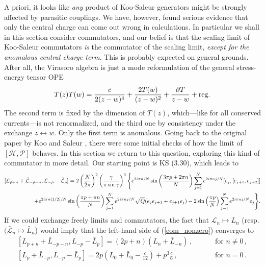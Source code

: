 \documentclass[a4paper,10pt]{article}
\newcommand{\linnea}[1]{$\framebox{\tiny L}$\ \textbf{\texttt{{\color{red}\footnotesize#1}}}}
\newcommand{\HN}{\mathcal{H}}
\newcommand{\PN}{\mathcal{P}}
\newcommand{\KSgen}{\mathcal{L}}
\begin{document}
A priori, it looks like {\sl any} product of Koo-Saleur generators might be strongly affected by parasitic couplings. We have, however, found serious evidence that only the central charge can come out wrong in calculations. In particular we shall in this section consider commutators, and our belief is that
  the scaling limit of Koo-Saleur commutators {\sl is} the commutator of the scaling limit, {\sl except for the anomalous central charge term}. This is probably expected on general grounds. After all, the Virasoro algebra is just a mode reformulation of the general stress-energy tensor OPE
%
\begin{equation}
T(z)T(w)={c\over 2(z-w)^4}+{2T(w)\over (z-w)^2}+{\partial T\over z-w}+\hbox{reg.}
\end{equation}
%
The second term is fixed by the dimension of $T(z)$, which---like for all conserved currents---is not renormalized,
and the third one by consistency under the exchange $z\leftrightarrow w$. Only the first term is anomalous. %
%
%
Going back to the original paper by Koo and Saleur \cite{KooSaleur}, there  were some initial checks of how the limit of $[\HN,\PN]$ behaves. In this section we return to this question, exploring this kind of commutator in more detail. Our starting point is KS (3.30), which leads to 
%
\begin{equation}\label{com_nonzero}
\begin{split}
[\KSgen_{p+n}+\bar{\KSgen}_{-p-n},\KSgen_{-p}-\bar{\KSgen}_{p}] 
= 2 \left({N\over2\pi}\right)^2 \left( \frac{\gamma}{\pi \sin \gamma} \right)^3\Bigg\{ e^{2 i \pi n/N}  \sin \left( \frac{3\pi p + 2\pi n}{N} \right) \sum_{j=1}^{N} e^{2i\pi n j/N}
 [e_j,[e_{j+1},e_{j+2}]] \\
 \quad+ e^{2 i \pi n(1/2)/N}  \sin \left( \frac{\pi p + \pi n}{N} \right) \sum_{j=1}^{N} e^{2i\pi n j/N}
 \sqrt{Q}(e_je_{j+1} + e_{j+1}e_j)  
 -2  \sin \left( \frac{\pi p }{N} \right) \sum_{j=1}^{N} e^{2i\pi n j/N}
 e_{j} 
\Bigg\}.
%
\end{split}
\end{equation}
%
If we could exchange freely limits and commutators, the fact that  $\KSgen_n\mapsto L_n$ (resp. $(\bar{\KSgen}_n\mapsto\bar{L}_n$)   would imply that the left-hand side of (\ref{com_nonzero})  converges to 
%
\begin{subequations}
\label{wishes}
\begin{eqnarray}
 \left[ L_{p+n} + \bar{L}_{-p-n} , L_{-p} - \bar{L}_{p} \right] =  (2p+n) \left( L_n +  \bar{L}_{-n} \right) \,,  \quad \quad &\text{ for } n\neq 0 \,, \label{wishes1} \\
%
 \left[ L_p + \bar{L}_{-p}, L_{-p} - \bar{L}_{p} \right]=   2p \left( L_0 + \bar{L}_0 - \frac{c}{12} \right) + p^3\frac{c}{6} \,,  \quad \quad &\text{ for } n= 0 \,. \label{wishes2}
\end{eqnarray}
\end{subequations}
\end{document}
